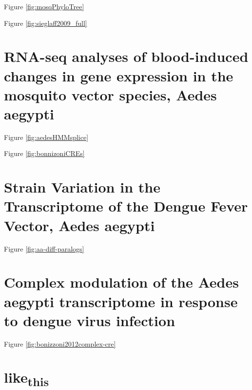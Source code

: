 Figure \ref{fig:mosqPhyloTree}


Figure \ref{fig:sieglaff2009_full}






\section{RNA-seq analyses of blood-induced changes in gene expression in the mosquito vector species, Aedes aegypti}

Figure \ref{fig:aedesHMMsplice}


Figure \ref{fig:bonnizoniCREs}




\section{Strain Variation in the Transcriptome of the Dengue Fever Vector, Aedes aegypti}

Figure \ref{fig:aa-diff-paralogs}




\section{Complex modulation of the Aedes aegypti transcriptome in response to dengue virus infection}

Figure \ref{fig:bonizzoni2012complex-cre}



\section{\texorpdfstring{like\textsubscript{this}}{like this}}

